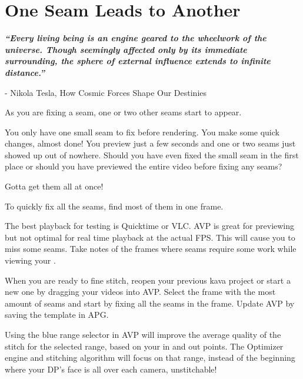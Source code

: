 \section{One Seam Leads to Another}
\pagecolor{white}
\label{chap:38}
\begin{fullwidth}

{\itshape\bfseries “Every living being is an engine geared to the wheelwork of the universe. Though seemingly affected only by its immediate surrounding, the sphere of external influence extends to infinite distance.”}

- Nikola Tesla, How Cosmic Forces Shape Our Destinies
\vspace{\baselineskip}

\problem

{\large As you are fixing a seam, one or two other seams start to appear. \par}

You only have one small seam to fix before rendering. You make some quick changes, almost done! You preview just a few seconds and one or two seams just showed up out of nowhere. Should you have even fixed the small seam in the first place or should you have previewed the entire video before fixing any seams?

\solutions

{\large Gotta get them all at once! \par}

To quickly fix all the seams, find most of them in one frame. 

\clearpage
The best playback for testing is Quicktime or VLC. AVP is great for previewing but not optimal for real time playback at the actual FPS. This will cause you to miss some seams. Take notes of the frames where seams require some work while viewing your \textbf{}.


When you are ready to fine stitch, reopen your previous kava project or start a new one by dragging your videos into AVP. Select the frame with the most amount of seams and start by fixing all the seams in the frame. Update AVP by saving the template in APG.

Using the blue range selector in AVP will improve the average quality of the stitch for the selected range, based on your in and out points. The Optimizer engine and stitching algorithm will focus on that range, instead of the beginning where your DP’s face is all over each camera, unstitchable!


\end{fullwidth}
